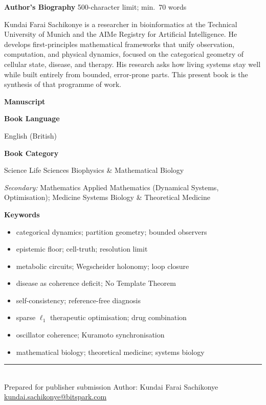 \documentclass[11pt,a4paper]{article}
\newcommand{\field}[3]{%
  \par\medskip
  {\color{labelcol}\bfseries\large #1}%
  \hfill{\color{limitcol}\small #2}\par
  \vspace{2pt}%
  \noindent\colorbox{fieldbg}{%
    \begin{minipage}{\dimexpr\linewidth-2\fboxsep\relax}
    \vspace{2pt}#3\vspace{2pt}
    \end{minipage}}%
  \par
}
\newcommand{\charcount}[2]{{\color{limitcol}\small\itshape [#1 characters / #2 limit]}}
\newcommand{\wordcount}[1]{{\color{limitcol}\small\itshape [#1 words]}}
\newcommand{\Section}[1]{%
  \par\addvspace{16pt}%
  {\color{rulecol}\Large\bfseries #1}\par
  \vspace{2pt}{\color{rulecol}\rule{\linewidth}{1pt}}\par\vspace{4pt}}
\begin{document}
\field{Author's Biography}{500-character limit; min.\ 70 words}{%
Kundai Farai Sachikonye is a researcher in bioinformatics at the Technical
University of Munich and the AIMe Registry for Artificial Intelligence. He
develops first-principles mathematical frameworks that unify observation,
computation, and physical dynamics, focused on the categorical geometry of
cellular state, disease, and therapy. His research asks how living systems stay
well while built entirely from bounded, error-prone parts. This present book is
the synthesis of that programme of work.
  \par\vspace{4pt}\charcount{499}{500}\quad\wordcount{70}
}

\Section{Manuscript}

\field{Book Language}{}{%
  English (British)
}

\field{Book Category}{}{%
  Science \guillemotright{} Life Sciences \guillemotright{} Biophysics \& Mathematical Biology
  \par\vspace{2pt}
  \textit{Secondary:} Mathematics \guillemotright{} Applied Mathematics (Dynamical Systems, Optimisation);\;
  Medicine \guillemotright{} Systems Biology \& Theoretical Medicine
}

\field{Keywords}{}{%
  \begin{minipage}{\linewidth}
  \begin{itemize}[leftmargin=1.4em,itemsep=1pt,topsep=2pt]
    \item categorical dynamics; partition geometry; bounded observers
    \item epistemic floor; cell-truth; resolution limit
    \item metabolic circuits; Wegscheider holonomy; loop closure
    \item disease as coherence deficit; No Template Theorem
    \item self-consistency; reference-free diagnosis
    \item sparse $\ell_1$ therapeutic optimisation; drug combination
    \item oscillator coherence; Kuramoto synchronisation
    \item mathematical biology; theoretical medicine; systems biology
  \end{itemize}
  \end{minipage}
}

\vfill
\begin{center}
{\color{limitcol}\rule{\linewidth}{0.8pt}}\\[3pt]
{\color{limitcol}\small Prepared for publisher submission \quad\textbullet\quad
Author: Kundai Farai Sachikonye \quad\textbullet\quad
\href{mailto:kundai.sachikonye@bitspark.com}{kundai.sachikonye@bitspark.com}}
\end{center}
\end{document}
